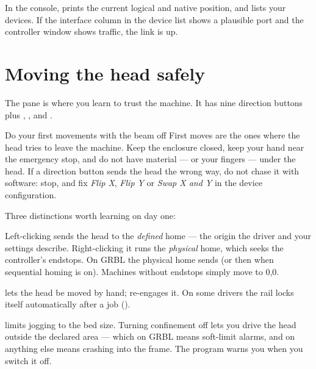 \noindent In the console,  prints the current logical and native
position, and  lists your devices. If the interface column in the
device list shows a plausible port and the controller window shows traffic, the
link is up.

\section{Moving the head safely}
\label{sec:jog}

The  pane is where you learn to trust the machine. It has nine
direction buttons plus , ,  and .

\begin{machinebox}{Do your first movements with the beam off}
First moves are the ones where the head tries to leave the machine. Keep the
enclosure closed, keep your hand near the emergency stop, and do not have
material --- or your fingers --- under the head. If a direction button sends the
head the wrong way, do not chase it with software: stop, and fix \emph{Flip X},
\emph{Flip Y} or \emph{Swap X and Y} in the device configuration.
\end{machinebox}

\noindent Three distinctions worth learning on day one:

\begin{description}[leftmargin=1.4em,style=nextline]
  \item[Home versus physical home] Left-clicking  sends the head to the
        \emph{defined} home --- the origin the driver and your settings describe.
        Right-clicking it runs the \emph{physical} home, which seeks the
        controller's endstops. On GRBL the physical home sends  (or
         then  when sequential homing is on). Machines without
        endstops simply move to 0,0.
  \item[Locked versus unlocked rail]  lets the head be moved by
        hand;  re-engages it. On some drivers the rail locks itself
        automatically after a job ().
  \item[Confined movement]  limits jogging to the bed size. Turning
        confinement off lets you drive the head outside the declared area ---
        which on GRBL means soft-limit alarms, and on anything else means
        crashing into the frame. The program warns you when you switch it off.
\end{description}

